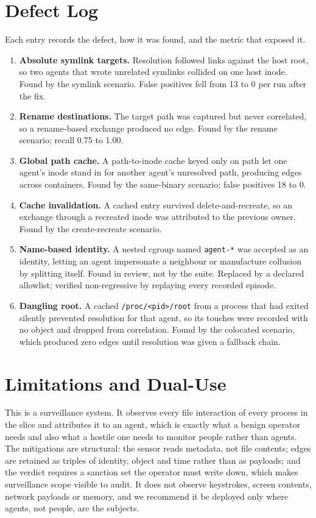 \documentclass[11pt]{article}
\begin{document}
\section{Defect Log}

Each entry records the defect, how it was found, and the metric that exposed it.

\begin{enumerate}
\item \textbf{Absolute symlink targets.} Resolution followed links against the host
root, so two agents that wrote unrelated symlinks collided on one host inode.
Found by the symlink scenario. False positives fell from 13 to 0 per run after the
fix.
\item \textbf{Rename destinations.} The target path was captured but never
correlated, so a rename-based exchange produced no edge. Found by the rename
scenario; recall 0.75 to 1.00.
\item \textbf{Global path cache.} A path-to-inode cache keyed only on path let one
agent's inode stand in for another agent's unresolved path, producing edges across
containers. Found by the same-binary scenario; false positives 18 to 0.
\item \textbf{Cache invalidation.} A cached entry survived
delete-and-recreate, so an exchange through a recreated inode was attributed to the
previous owner. Found by the create-recreate scenario.
\item \textbf{Name-based identity.} A nested cgroup named \texttt{agent-*} was
accepted as an identity, letting an agent impersonate a neighbour or manufacture
collusion by splitting itself. Found in review, not by the suite. Replaced by a
declared allowlist; verified non-regressive by replaying every recorded episode.
\item \textbf{Dangling root.} A cached \texttt{/proc/<pid>/root} from a process
that had exited silently prevented resolution for that agent, so its touches were
recorded with no object and dropped from correlation. Found by the colocated
scenario, which produced zero edges until resolution was given a fallback chain.
\end{enumerate}

\section{Limitations and Dual-Use}

This is a surveillance system. It observes every file interaction of every process
in the slice and attributes it to an agent, which is exactly what a benign operator
needs and also what a hostile one needs to monitor people rather than agents. The
mitigations are structural: the sensor reads metadata, not file contents; edges are
retained as triples of identity, object and time rather than as payloads; and the
verdict requires a sanction set the operator must write down, which makes
surveillance scope visible to audit. It does not observe keystrokes, screen
contents, network payloads or memory, and we recommend it be deployed only where
agents, not people, are the subjects.
\end{document}
